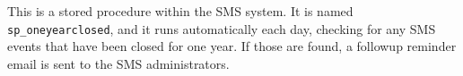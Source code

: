 This is a stored procedure within the SMS system. It is named
\verb|sp_oneyearclosed|, and it runs automatically each day, checking for any
SMS events that have been closed for one year. If those are found, a followup
reminder email is sent to the SMS administrators.


